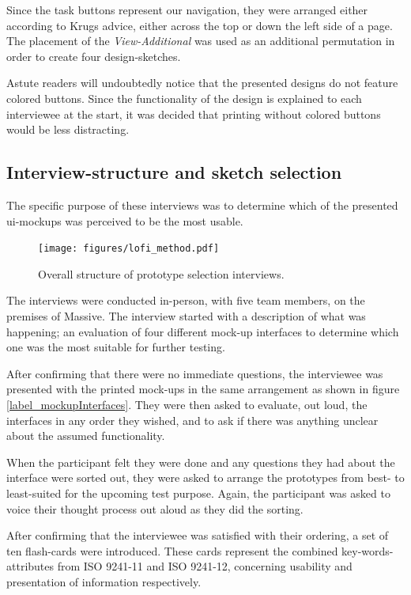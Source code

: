 {	Since the task buttons represent our navigation, they were arranged either
	according to Krugs advice, either across the top or down the left side of a
	page. The placement of the \textit{View-Additional} was used as an additional
	permutation in order to create four design-sketches.

	Astute readers will undoubtedly notice that the presented designs do not
	feature colored buttons. Since the functionality of the design is explained
	to each interviewee at the start, it was decided that printing without colored
	buttons would be less distracting.

	\subsection{Interview-structure and sketch selection}

    The specific purpose of these interviews was to determine which of the
    presented ui-mockups was perceived to be the most usable.

    \begin{figure}[h!]
      \centering
      \texttt{[image: figures/lofi\_method.pdf]}
      \caption{Overall structure of prototype selection interviews.}
    \end{figure}

    The interviews were conducted in-person, with five team members, on
    the premises of Massive. The interview started with a description of
    what was happening; an evaluation of four different mock-up interfaces
    to determine which one was the most suitable for further testing.

    After confirming that there were no immediate questions, the
    interviewee was presented with the printed mock-ups in the same
    arrangement as shown in figure \ref{label_mockupInterfaces}. They were
    then asked to evaluate, out loud, the interfaces in any order they
    wished, and to ask if there was anything unclear about the assumed
    functionality.

    When the participant felt they were done and any questions they had
    about the interface were sorted out, they were asked to arrange the
    prototypes from best- to least-suited for the upcoming test purpose.
    Again, the participant was asked to voice their thought process out
    aloud as they did the sorting.

    After confirming that the interviewee was satisfied with their ordering, a
    set of ten flash-cards were introduced. These cards represent the combined
    key-words-attributes from ISO 9241-11\cite{citeISO9241} and ISO
    9241-12\cite{citeISO9241-12}, concerning usability and presentation of
    information respectively.

}

